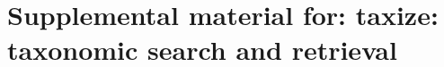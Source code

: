 \chapter{Supplemental material for: taxize: taxonomic search and retrieval}
\label{ap:taxize}  





% 
